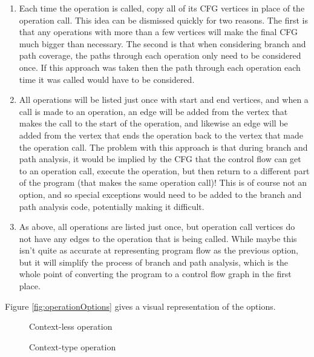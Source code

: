 \begin{enumerate}
\item Each time the operation is called, copy all of its CFG vertices in place of the operation call. This idea can be dismissed quickly for two reasons. The first is that any operations with more than a few vertices will make the final CFG much bigger than necessary. The second is that when considering branch and path coverage, the paths through each operation only need to be considered once. If this approach was taken then the path through each operation each time it was called would have to be considered.
\item All operations will be listed just once with start and end vertices, and when a call is made to an operation, an edge will be added from the vertex that makes the call to the start of the operation, and likewise an edge will be added from the vertex that ends the operation back to the vertex that made the operation call. The problem with this approach is that during branch and path analysis, it would be implied by the CFG that the control flow can get to an operation call, execute the operation, but then return to a different part of the program (that makes the same operation call)! This is of course not an option, and so special exceptions would need to be added to the branch and path analysis code, potentially making it difficult.
\item As above, all operations are listed just once, but operation call vertices do not have any edges to the operation that is being called. While maybe this isn't quite as accurate at representing program flow as the previous option, but it will simplify the process of branch and path analysis, which is the whole point of converting the program to a control flow graph in the first place.
\end{enumerate}

Figure \ref{fig:operationOptions} gives a visual representation of the options.

\begin{figure}

\caption{Context-less operation}
\label{lst:contextlessOp}
\end{figure}

\begin{figure}

\caption{Context-type operation}
\label{lst:contexttypeOp}
\end{figure}

